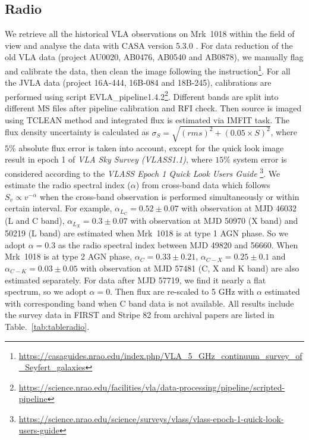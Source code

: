 \documentclass[twocolumn]{aastex63}
\begin{document}
\subsection{Radio}
\label{subsec:vla}
We retrieve all the historical VLA observations on Mrk~1018 within the field of view and analyse the data with CASA version 5.3.0 \citep{2007ASPC..376..127M}. For data reduction of the old VLA data (project AU0020, AB0476, AB0540 and AB0878), we manually flag and calibrate the data, then clean the image following the instruction\footnote{\url{https://casaguides.nrao.edu/index.php/VLA_5_GHz_continuum_survey_of_Seyfert_galaxies}}. For all the JVLA data (project 16A-444, 16B-084 and 18B-245), calibrations are performed using script EVLA\_pipeline1.4.2\footnote{\url{https://science.nrao.edu/facilities/vla/data-processing/pipeline/scripted-pipeline}}. Different bands are split into different MS files after pipeline calibration and RFI check. Then source is imaged using {\scriptsize TCLEAN} method and integrated flux is estimated via {\scriptsize IMFIT} task. The flux density uncertainty is calculated as $\sigma_{S}=\sqrt{(rms)^2+(0.05\times S)^2}$, where $5 \%$ absolute flux error is taken into account, except for the quick look image result in epoch 1 of  {\em VLA Sky Survey (VLASS1.1)}, where $15 \%$ system error is considered according to the {\em VLASS Epoch 1 Quick Look Users Guide} \footnote{\url{https://science.nrao.edu/science/surveys/vlass/vlass-epoch-1-quick-look-users-guide}}. We estimate the radio spectral index ($\alpha$) from cross-band data which follows $S_v \propto v^{-\alpha}$  when the cross-band observation is performed simultaneously or within certain interval. For example, $\alpha_{L_C} =0.52 \pm 0.07$ with observation at MJD 46032 (L and C band), $\alpha_{L_X} =0.3 \pm 0.07$ with observation at MJD 50970 (X band) and 50219 (L band) are estimated when Mrk~1018 is at type 1 AGN phase. So we adopt $\alpha=0.3$ as the radio spectral index between MJD 49820 and 56660. When Mrk~1018 is at type 2 AGN phase, $\alpha_{C} =0.33\pm0.21$, $\alpha_{C-X} =0.25\pm0.1$ and $\alpha_{C-K} =0.03\pm0.05$ with observation at MJD 57481 (C, X and K band) are also estimated separately. For data after MJD 57719, we find it nearly a flat spectrum, so we adopt $\alpha=0$. Then flux are re-scaled to 5 GHz with $\alpha$ estimated with corresponding band when C band data is not available.  All results include the survey data in FIRST\citep{1994ASPC...61..165B,1995ApJ...450..559B} and Stripe 82\citep{2011AJ....142....3H} from archival papers are listed in Table.~\ref{tab:tableradio}.
\end{document}
